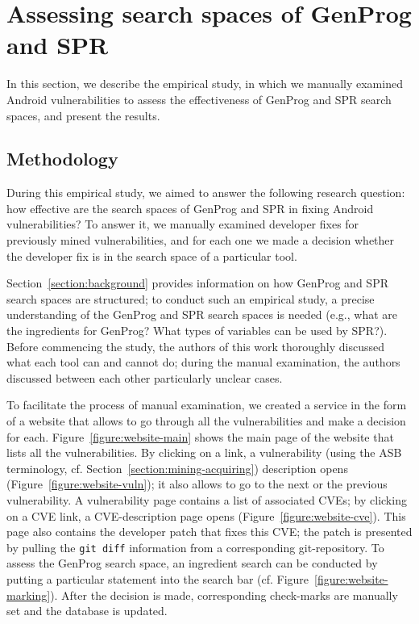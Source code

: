 \section{Assessing search spaces of GenProg and SPR}
\label{section:assessing}

In this section, we describe the empirical study, in which we manually examined \numvuln Android vulnerabilities to assess the effectiveness of GenProg and SPR search spaces, and present the results.

\subsection{Methodology}

During this empirical study, we aimed to answer the following research question: how effective are the search spaces of GenProg and SPR in fixing Android vulnerabilities?
To answer it, we manually examined developer fixes for \numvuln previously mined vulnerabilities, and for each one we made a decision whether the developer fix is in the search space of a particular tool.

Section~\ref{section:background} provides information on how GenProg and SPR search spaces are structured; to conduct such an empirical study, a precise understanding of the GenProg and SPR search spaces is needed (e.g., what are the ingredients for GenProg? What types of variables can be used by SPR?). Before commencing the study, the authors of this work thoroughly discussed what each tool can and cannot do; during the manual examination, the authors discussed between each other particularly unclear cases.

To facilitate the process of manual examination, we created a service in the form of a website that allows to go through all the vulnerabilities and make a decision for each.
Figure~\ref{figure:website-main} shows the main page of the website that lists all the vulnerabilities.
By clicking on a link, a vulnerability (using the ASB terminology, cf. Section~\ref{section:mining-acquiring}) description opens (Figure~\ref{figure:website-vuln}); it also allows to go to the next or the previous vulnerability.
A vulnerability page contains a list of associated CVEs; by clicking on a CVE link, a CVE-description page opens (Figure~\ref{figure:website-cve}).
This page also contains the developer patch that fixes this CVE; the patch is presented by pulling the \texttt{git diff} information from a corresponding git-repository.
To assess the GenProg search space, an ingredient search can be conducted by putting a particular statement into the search bar (cf. Figure~\ref{figure:website-marking}).
After the decision is made, corresponding check-marks are manually set and the database is updated.

